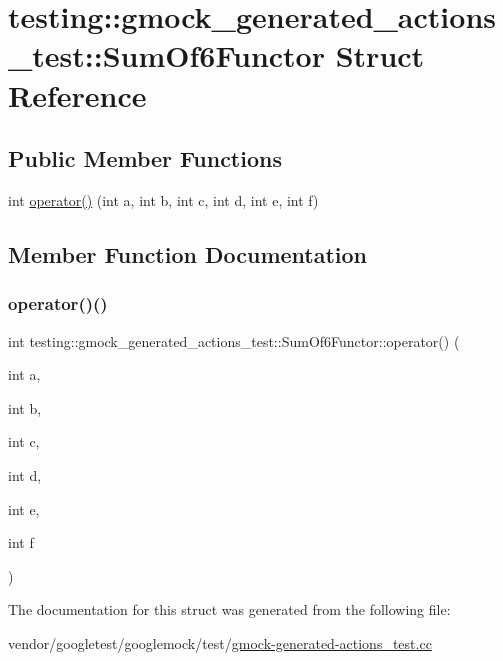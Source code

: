 \hypertarget{structtesting_1_1gmock__generated__actions__test_1_1_sum_of6_functor}{}\section{testing\+:\+:gmock\+\_\+generated\+\_\+actions\+\_\+test\+:\+:Sum\+Of6\+Functor Struct Reference}
\label{structtesting_1_1gmock__generated__actions__test_1_1_sum_of6_functor}
\subsection*{Public Member Functions}
\begin{DoxyCompactItemize}
\item 
int \hyperlink{structtesting_1_1gmock__generated__actions__test_1_1_sum_of6_functor_adb500f7bdfa5a5887623fa38cd805e41}{operator()} (int a, int b, int c, int d, int e, int f)
\end{DoxyCompactItemize}


\subsection{Member Function Documentation}
\mbox{\label{structtesting_1_1gmock__generated__actions__test_1_1_sum_of6_functor_adb500f7bdfa5a5887623fa38cd805e41}} 
\subsubsection{\texorpdfstring{operator()()}{operator()()}}
{\footnotesize\ttfamily int testing\+::gmock\+\_\+generated\+\_\+actions\+\_\+test\+::\+Sum\+Of6\+Functor\+::operator() (\begin{DoxyParamCaption}\item[{int}]{a,  }\item[{int}]{b,  }\item[{int}]{c,  }\item[{int}]{d,  }\item[{int}]{e,  }\item[{int}]{f }\end{DoxyParamCaption})\hspace{0.3cm}{\ttfamily [inline]}}



The documentation for this struct was generated from the following file\+:\begin{DoxyCompactItemize}
\item 
vendor/googletest/googlemock/test/\hyperlink{gmock-generated-actions__test_8cc}{gmock-\/generated-\/actions\+\_\+test.\+cc}\end{DoxyCompactItemize}
